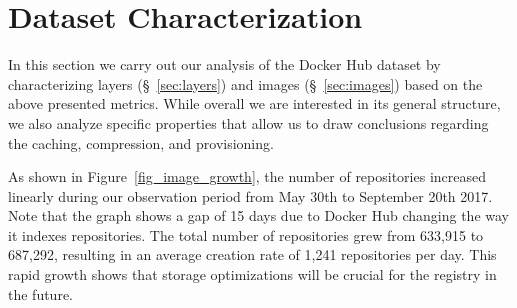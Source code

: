 \section{Dataset Characterization}
\label{sec:char}

In this section we carry out our analysis of the Docker Hub dataset by characterizing
layers (\S~\ref{sec:layers}) and images (\S~\ref{sec:images}) based on
the above presented metrics. While overall we are interested in its general structure,
we also analyze specific properties that allow us to draw conclusions regarding the
caching, compression, and provisioning.

As shown in Figure~\ref{fig_image_growth}, the number of repositories increased
linearly during our observation period from May 30th to September 20th
2017. Note that the graph shows a gap of 15 days due to Docker Hub changing the way it
indexes repositories. The total number of repositories
grew from 633,915 to 687,292, resulting in an average creation rate of 1,241
repositories per day. This rapid growth shows that storage optimizations will
be crucial for the registry in the future.

%



